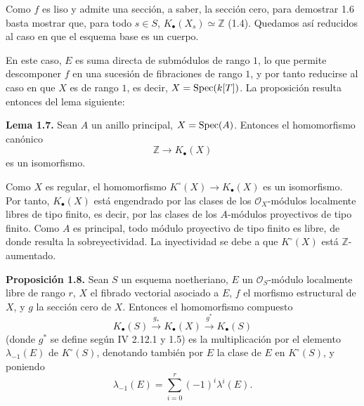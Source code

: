 Como $f$ es liso y admite una sección, a saber, la sección cero, para demostrar 1.6 basta mostrar que, para todo $s\in S$, $K_\bullet(X_s)\simeq \mathbb Z$ (1.4). Quedamos así reducidos al caso en que el esquema base es un cuerpo.

En este caso, $E$ es suma directa de submódulos de rango $1$, lo que permite descomponer $f$ en una sucesión de fibraciones de rango $1$, y por tanto reducirse al caso en que $X$ es de rango $1$, es decir, $X=\operatorname{Spec}(k[T])$. La proposición resulta entonces del lema siguiente:

\textbf{Lema 1.7.} Sean $A$ un anillo principal, $X=\operatorname{Spec}(A)$. Entonces el homomorfismo canónico
\[
\mathbb Z\longrightarrow K_\bullet(X)
\]
es un isomorfismo.

Como $X$ es regular, el homomorfismo $K^\circ(X)\to K_\bullet(X)$ es un isomorfismo. Por tanto, $K_\bullet(X)$ está engendrado por las clases de los $\mathcal O_X$-módulos localmente libres de tipo finito, es decir, por las clases de los $A$-módulos proyectivos de tipo finito. Como $A$ es principal, todo módulo proyectivo de tipo finito es libre, de donde resulta la sobreyectividad. La inyectividad se debe a que $K^\circ(X)$ está $\mathbb Z$-aumentado.

\textbf{Proposición 1.8.} Sean $S$ un esquema noetheriano, $E$ un $\mathcal O_S$-módulo localmente libre de rango $r$, $X$ el fibrado vectorial asociado a $E$, $f$ el morfismo estructural de $X$, y $g$ la sección cero de $X$. Entonces el homomorfismo compuesto
\[
K_\bullet(S)\xrightarrow{g_*}K_\bullet(X)\xrightarrow{g^*}K_\bullet(S)
\]
(donde $g^*$ se define según IV 2.12.1 y 1.5) es la multiplicación por el elemento $\lambda_{-1}(E)$ de $K^\circ(S)$, denotando también por $E$ la clase de $E$ en $K^\circ(S)$, y poniendo
\[
\lambda_{-1}(E)=\sum_{i=0}^r(-1)^i\lambda^i(E).
\]

